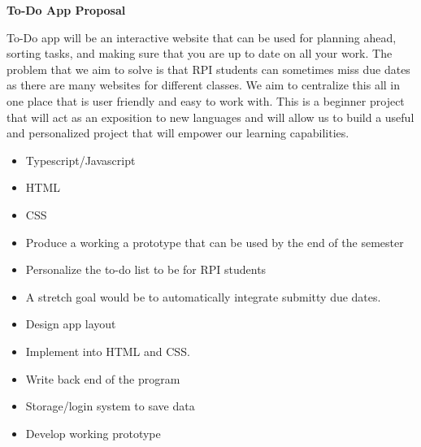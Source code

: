 \documentclass[12pt]{article}
\begin{document}
\begin{center}
{\huge \bf To-Do App Proposal}
\end{center}
\bigskip


\bigskip

\noindent To-Do app will be an interactive website that can be used for planning ahead, sorting tasks, 
and making sure that you are up to date on all your work. The problem that we aim to solve is that RPI 
students can sometimes miss due dates as there are many websites for different classes.
We aim to centralize this all in one place that is user friendly and easy to work with.
This is a beginner project that will act as an exposition to new languages and will allow us to
build a useful and personalized project that will empower our learning capabilities.

\bigskip

\begin{itemize}{}
  \item Typescript/Javascript
  \item HTML
  \item CSS
\end{itemize}

\bigskip

\begin{itemize}
  \item Produce a working a prototype that can be used by the end of the semester
  \item Personalize the to-do list to be for RPI students
  \item A stretch goal would be to automatically integrate submitty due dates.
\end{itemize}
\bigskip


\medskip

\begin{itemize}
  \item Design app layout
  \item Implement into HTML and CSS.
\end{itemize}

\begin{itemize}
  \item Write back end of the program
  \item Storage/login system to save data
  \item Develop working prototype
\end{itemize}
\end{document}
